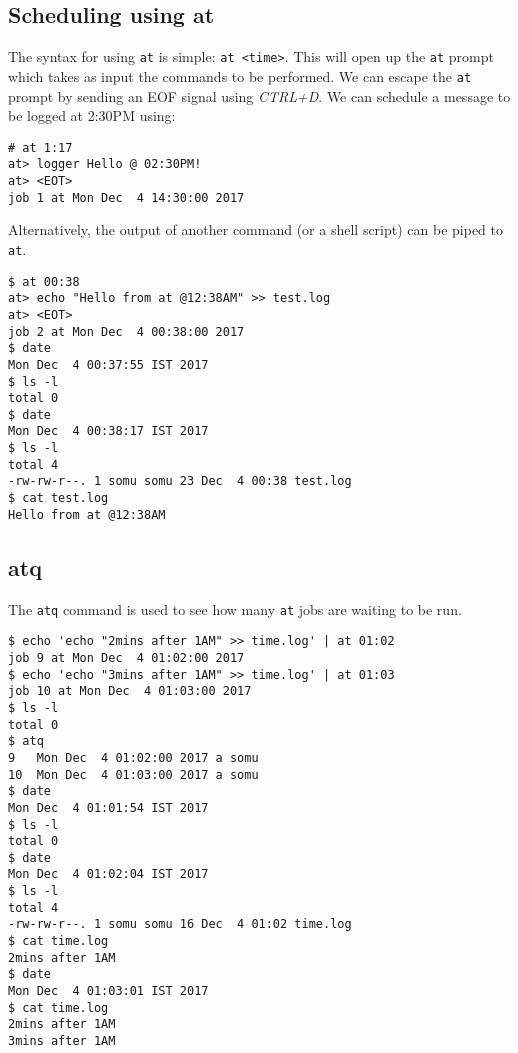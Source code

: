 \subsection{Scheduling using at}
The syntax for using \verb|at| is simple: \verb|at <time>|. This will open up the \verb|at| prompt which takes as input the commands to be performed. We can escape the \verb|at| prompt by sending an EOF signal using \textit{CTRL+D}. We can schedule a message to be logged at 2:30PM using:

\vspace{-15pt}
\begin{verbatim}
# at 1:17
at> logger Hello @ 02:30PM!
at> <EOT>
job 1 at Mon Dec  4 14:30:00 2017
\end{verbatim}
\vspace{-10pt}

\noindent
Alternatively, the output of another command (or a shell script) can be piped to \verb|at|. 

\vspace{-15pt}
\begin{verbatim}
$ at 00:38
at> echo "Hello from at @12:38AM" >> test.log
at> <EOT>
job 2 at Mon Dec  4 00:38:00 2017
$ date
Mon Dec  4 00:37:55 IST 2017	
$ ls -l
total 0
$ date
Mon Dec  4 00:38:17 IST 2017
$ ls -l
total 4
-rw-rw-r--. 1 somu somu 23 Dec  4 00:38 test.log
$ cat test.log
Hello from at @12:38AM
\end{verbatim}
\vspace{-10pt}

\subsection{atq}
The \verb|atq| command is used to see how many \verb|at| jobs are waiting to be run. 

\vspace{-15pt}
\begin{verbatim}
$ echo 'echo "2mins after 1AM" >> time.log' | at 01:02
job 9 at Mon Dec  4 01:02:00 2017
$ echo 'echo "3mins after 1AM" >> time.log' | at 01:03
job 10 at Mon Dec  4 01:03:00 2017
$ ls -l
total 0
$ atq
9	Mon Dec  4 01:02:00 2017 a somu
10	Mon Dec  4 01:03:00 2017 a somu
$ date
Mon Dec  4 01:01:54 IST 2017
$ ls -l
total 0
$ date
Mon Dec  4 01:02:04 IST 2017
$ ls -l
total 4
-rw-rw-r--. 1 somu somu 16 Dec  4 01:02 time.log
$ cat time.log
2mins after 1AM
$ date
Mon Dec  4 01:03:01 IST 2017
$ cat time.log
2mins after 1AM
3mins after 1AM
\end{verbatim}
\vspace{-10pt}

